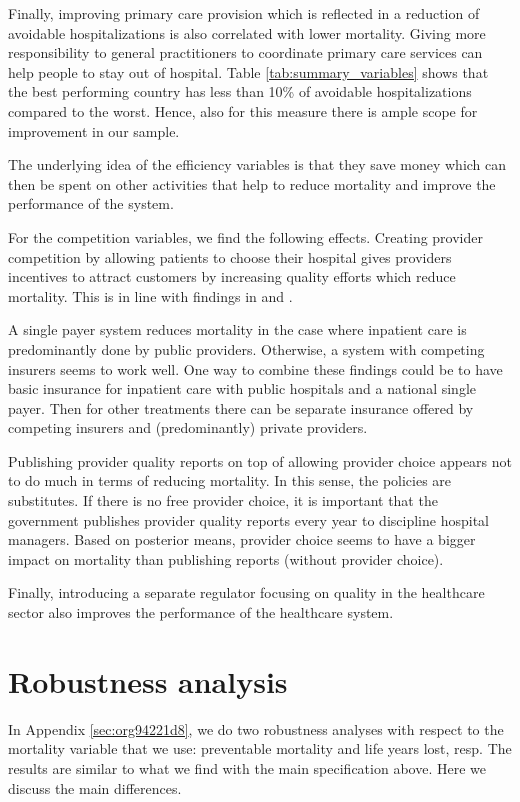 \documentclass[a4paper,12pt]{article}
\begin{document}
Finally, improving primary care provision which is reflected in a reduction of avoidable hospitalizations is also correlated with lower mortality. Giving more responsibility to general practitioners to coordinate primary care services can help people to stay out of hospital. Table \ref{tab:summary_variables} shows that the best performing country has less than 10\% of avoidable hospitalizations compared to the worst. Hence, also for this measure there is ample scope for improvement in our sample. 

The underlying idea of the efficiency variables is that they save money which can then be spent on other activities that help to reduce mortality and improve the performance of the system.

For the competition variables, we find the following effects. Creating provider competition by allowing patients to choose their hospital gives providers incentives to attract customers by increasing quality efforts which reduce mortality. This is in line with findings in \cite{NBERw19800} and \cite{teisberg}.

A single payer system reduces mortality in the case where inpatient care is predominantly done by public providers. Otherwise, a system with competing insurers seems to work well. One way to combine these findings could be to have basic insurance for inpatient care with public hospitals and a national single payer. Then for other treatments there can be separate insurance offered by competing insurers and (predominantly) private providers.

Publishing provider quality reports on top of allowing provider choice appears not to do much in terms of reducing mortality. In this sense, the policies are substitutes. If there is no free provider choice, it is important that the government publishes provider quality reports every year to discipline hospital managers. Based on posterior means, provider choice seems to have a bigger impact on mortality than publishing reports (without provider choice).

Finally, introducing a separate regulator focusing on quality in the healthcare sector also improves the performance of the healthcare system.

\section{Robustness analysis}
\label{sec:org99c7708}

In Appendix \ref{sec:org94221d8}, we do two robustness analyses with respect to the mortality variable that we use: preventable mortality and  life years lost, resp. The results are similar to what we find with the main specification above. Here we discuss the main differences.
\end{document}

